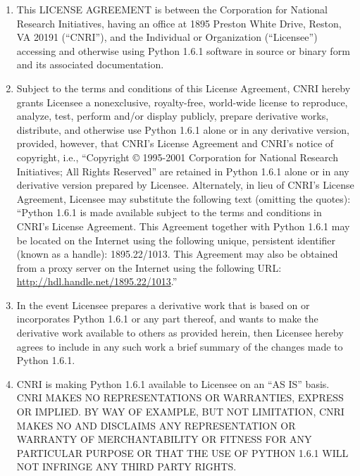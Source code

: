 \centerline{}

\begin{enumerate}
\item
This LICENSE AGREEMENT is between the Corporation for National
Research Initiatives, having an office at 1895 Preston White Drive,
Reston, VA 20191 (``CNRI''), and the Individual or Organization
(``Licensee'') accessing and otherwise using Python 1.6.1 software in
source or binary form and its associated documentation.

\item
Subject to the terms and conditions of this License Agreement, CNRI
hereby grants Licensee a nonexclusive, royalty-free, world-wide
license to reproduce, analyze, test, perform and/or display publicly,
prepare derivative works, distribute, and otherwise use Python 1.6.1
alone or in any derivative version, provided, however, that CNRI's
License Agreement and CNRI's notice of copyright, i.e., ``Copyright
\copyright{} 1995-2001 Corporation for National Research Initiatives;
All Rights Reserved'' are retained in Python 1.6.1 alone or in any
derivative version prepared by Licensee.  Alternately, in lieu of
CNRI's License Agreement, Licensee may substitute the following text
(omitting the quotes): ``Python 1.6.1 is made available subject to the
terms and conditions in CNRI's License Agreement.  This Agreement
together with Python 1.6.1 may be located on the Internet using the
following unique, persistent identifier (known as a handle):
1895.22/1013.  This Agreement may also be obtained from a proxy server
on the Internet using the following URL:
\url{http://hdl.handle.net/1895.22/1013}.''

\item
In the event Licensee prepares a derivative work that is based on
or incorporates Python 1.6.1 or any part thereof, and wants to make
the derivative work available to others as provided herein, then
Licensee hereby agrees to include in any such work a brief summary of
the changes made to Python 1.6.1.

\item
CNRI is making Python 1.6.1 available to Licensee on an ``AS IS''
basis.  CNRI MAKES NO REPRESENTATIONS OR WARRANTIES, EXPRESS OR
IMPLIED.  BY WAY OF EXAMPLE, BUT NOT LIMITATION, CNRI MAKES NO AND
DISCLAIMS ANY REPRESENTATION OR WARRANTY OF MERCHANTABILITY OR FITNESS
FOR ANY PARTICULAR PURPOSE OR THAT THE USE OF PYTHON 1.6.1 WILL NOT
INFRINGE ANY THIRD PARTY RIGHTS.


\end{enumerate}
